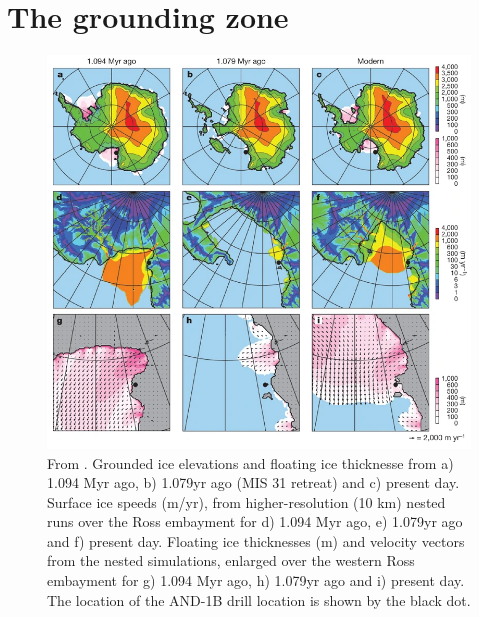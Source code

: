 \newpage
\section{The grounding zone} \label{sec:grounding_zone_science}


\begin{figure}[!ht]
\centering
\includegraphics[width=1\textwidth]{chapters/1/pollard.png}
\caption[Modelled past Ross Ice Shelf extent]{From \cite{pollard2009modelling}.
Grounded ice elevations and floating ice thicknesse from a) 1.094 Myr ago, b) 1.079yr ago (MIS 31 retreat) and c) present day.
Surface ice speeds (m/yr), from higher-resolution (10 km) nested runs over the Ross embayment for d) 1.094 Myr ago, e) 1.079yr ago and f) present day.
Floating ice thicknesses (m) and velocity vectors from the nested simulations, enlarged over the western Ross embayment for  g) 1.094 Myr ago, h) 1.079yr ago and i) present day.
The location of the AND-1B drill location is shown by the black dot.}
\label{fig:pollard}
\end{figure}  

